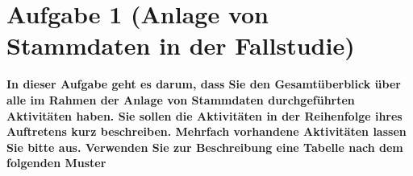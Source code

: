 \section{Aufgabe 1 (Anlage von Stammdaten in der Fallstudie)}
\textbf{In dieser Aufgabe geht es darum, dass Sie den Gesamtüberblick über alle im Rahmen der Anlage
von Stammdaten durchgeführten Aktivitäten haben. Sie sollen die Aktivitäten in der Reihenfolge
ihres Auftretens kurz beschreiben. Mehrfach vorhandene Aktivitäten lassen Sie bitte aus.
Verwenden Sie zur Beschreibung eine Tabelle nach dem folgenden Muster}

\clearpage
{}

\clearpage 